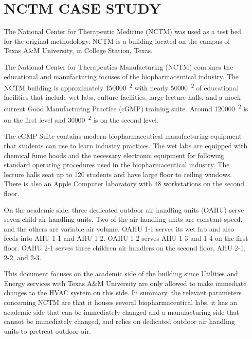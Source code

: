 \chapter{\texorpdfstring{\MakeUppercase{NCTM Case Study}}{NCTM Case Study}}
The National Center for Therapeutic Medicine (NCTM) was used as a test
bed for the original methodology. NCTM is a building located on the
campus of Texas A\&M University, in College Station, Texas. 

The National Center for Therapeutics Manufacturing (NCTM) combines the
educational and manufacturing focuses of the biopharmaceutical industry.  The
NCTM building is approximately \SI{150000}{\feet\squared} with nearly
\SI{50000}{\feet\squared} of educational facilities that include wet labs,
culture facilities, large lecture halls, and a mock current Good Manufacturing
Practice (cGMP) training suite. Around \SI{120000}{\feet\squared} is on the
first level and \SI{30000}{\feet\squared} is on the second level. 

The cGMP Suite contains modern biopharmaceutical manufacturing equipment
that students can use to learn industry practices. The wet labs are
equipped with chemical fume hoods and the necessary electronic equipment
for following standard operating procedures used in the
biopharmaceutical industry. The lecture halls seat up to 120 students
and have large floor to ceiling windows. There is also an Apple Computer
laboratory with 48 workstations on the second floor. 

On the academic side, three dedicated outdoor air handling
units (OAHU) serve seven child air handling units. Two of the air handling
units are constant speed, and the others are variable air volume. OAHU
1-1 serves its wet lab and also feeds into AHU 1-1 and AHU 1-2. OAHU
1-2 serves AHU 1-3 and 1-4 on the first floor. OAHU 2-1 serves three
children air handlers on the second floor, AHU 2-1, 2-2, and 2-3. 

This document focuses on the academic side of the building since
Utilities and Energy services with Texas A\&M University are only
allowed to make immediate changes to the HVAC system on this side. In
summary, the relevant parameters concerning NCTM are that it houses
several biopharmaceutical labs, it has an academic side that can be
immediately changed and a manufacturing side that cannot be immediately
changed, and relies on dedicated outdoor air handling units to pretreat
outdoor air. 


